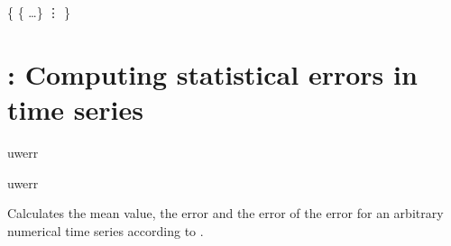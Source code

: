 \begin{code}
\{
  \{      \dots \}
  \vdots
\}
\end{code}

\section{: Computing statistical errors in time series}
\label{sec:uwerr}

\begin{essyntax}
   uwerr   
    

   uwerr   
    
\end{essyntax}
Calculates the mean value, the error and the error of the error for an
arbitrary numerical time series according to \citet{wolff04a}.

